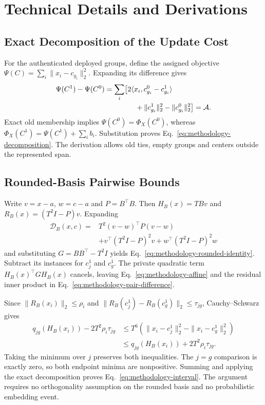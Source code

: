 \documentclass[5p,times,twocolumn]{elsarticle}
\begin{document}
\clearpage

\FloatBarrier
\appendix
\section{Technical Details and Derivations}
\label{app:methodology-proofs}
\subsection{Exact Decomposition of the Update Cost}
For the authenticated deployed groups, define the assigned objective
$\Psi(C)=\sum_i\|x_i-c_{g_i}\|_2^2$. Expanding its difference gives
\begin{align}
 \Psi(C^1)-\Psi(C^0)
 &=\sum_i\bigl[2\langle x_i,c^0_{g_i}-c^1_{g_i}\rangle\nonumber\\
 &\hspace{15mm}+\|c^1_{g_i}\|_2^2-\|c^0_{g_i}\|_2^2\bigr]
 =\mathcal A.
\end{align}
Exact old membership implies $\Psi(C^0)=\Phi_X(C^0)$, whereas
$\Phi_X(C^1)=\Psi(C^1)+\sum_i b_i$. Substitution proves
Eq.~\eqref{eq:methodology-decomposition}. The derivation allows old ties,
empty groups and centers outside the represented span.

\subsection{Rounded-Basis Pairwise Bounds}
Write $v=x-a$, $w=c-a$ and $P=B^\top B$. Then
$H_B(x)=TBv$ and $R_B(x)=(T^2I-P)v$. Expanding
\begin{align}
 \mathcal D_B(x,c)
 ={}&T^2(v-w)^\top P(v-w)\nonumber\\
 &+v^\top(T^2I-P)^2v+w^\top(T^2I-P)^2w
\end{align}
and substituting $G=BB^\top-T^2I$ yields
Eq.~\eqref{eq:methodology-rounded-identity}. Subtract its instances for
$c^1_j$ and $c^1_g$. The private quadratic term $H_B(x)^\top GH_B(x)$
cancels, leaving Eq.~\eqref{eq:methodology-affine} and the residual inner
product in Eq.~\eqref{eq:methodology-pair-difference}.

Since $\|R_B(x_i)\|_2\leq\rho_i$ and
$\|R_B(c^1_j)-R_B(c^1_g)\|_2\leq\tau_{jg}$, Cauchy--Schwarz gives
\begin{align}
 q_{jg}(H_B(x_i))-2T^2\rho_i\tau_{jg}
 &\leq T^6(\|x_i-c^1_j\|_2^2-\|x_i-c^1_g\|_2^2)\nonumber\\
 &\leq q_{jg}(H_B(x_i))+2T^2\rho_i\tau_{jg}.
\end{align}
Taking the minimum over $j$ preserves both inequalities. The $j=g$
comparison is exactly zero, so both endpoint minima are nonpositive.
Summing and applying the exact decomposition proves
Eq.~\eqref{eq:methodology-interval}. The argument requires no orthogonality
assumption on the rounded basis and no probabilistic embedding event.
\end{document}

